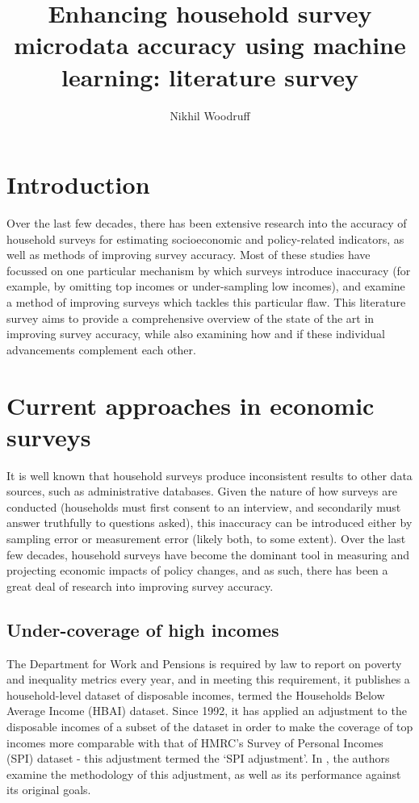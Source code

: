 \documentclass[twocolumn]{article}
\title{Enhancing household survey microdata accuracy using machine learning: literature survey}
\date{}
\author{Nikhil Woodruff}
\begin{document}
\maketitle

\tableofcontents

\section{Introduction}

Over the last few decades, there has been extensive research into the accuracy of household surveys for estimating socioeconomic and policy-related indicators, as well as methods of improving survey accuracy. Most of these studies have focussed on one particular mechanism by which surveys introduce inaccuracy (for example, by omitting top incomes or under-sampling low incomes), and examine a method of improving surveys which tackles this particular flaw. This literature survey aims to provide a comprehensive overview of the state of the art in improving survey accuracy, while also examining how and if these individual advancements complement each other.

\section{Current approaches in economic surveys}

It is well known that household surveys produce inconsistent results to other data sources, such as administrative databases. Given the nature of how surveys are conducted (households must first consent to an interview, and secondarily must answer truthfully to questions asked), this inaccuracy can be introduced either by sampling error or measurement error (likely both, to some extent). Over the last few decades, household surveys have become the dominant tool in measuring and projecting economic impacts of policy changes, and as such, there has been a great deal of research into improving survey accuracy.

\subsection{Under-coverage of high incomes}

The Department for Work and Pensions is required by law to report on poverty and inequality metrics every year, and in meeting this requirement, it publishes a household-level dataset of disposable incomes, termed the Households Below Average Income (HBAI) dataset.\cite{hbai} Since 1992, it has applied an adjustment to the disposable incomes of a subset of the dataset in order to make the coverage of top incomes more comparable with that of HMRC's Survey of Personal Incomes (SPI) dataset - this adjustment termed the `SPI adjustment'. In \cite{ifs_survey_under_coverage}, the authors examine the methodology of this adjustment, as well as its performance against its original goals.
\end{document}
